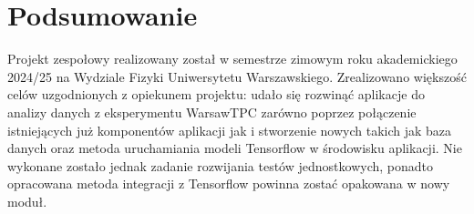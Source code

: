 \documentclass{article}
\begin{document}
\section{Podsumowanie}

Projekt zespołowy realizowany został w semestrze zimowym roku akademickiego 2024/25 na Wydziale Fizyki Uniwersytetu Warszawskiego. Zrealizowano większość celów uzgodnionych z opiekunem projektu: udało się rozwinąć aplikacje do analizy danych z eksperymentu WarsawTPC zarówno poprzez połączenie istniejących już komponentów aplikacji jak i stworzenie nowych takich jak baza danych oraz metoda uruchamiania modeli Tensorflow w środowisku aplikacji. Nie wykonane zostało jednak zadanie rozwijania testów jednostkowych, ponadto opracowana metoda integracji z Tensorflow powinna zostać opakowana w nowy moduł.

\setcounter{biburllcpenalty}{7}
\setcounter{biburlucpenalty}{8}

\printbibliography[title=Bibliografia]
\end{document}

